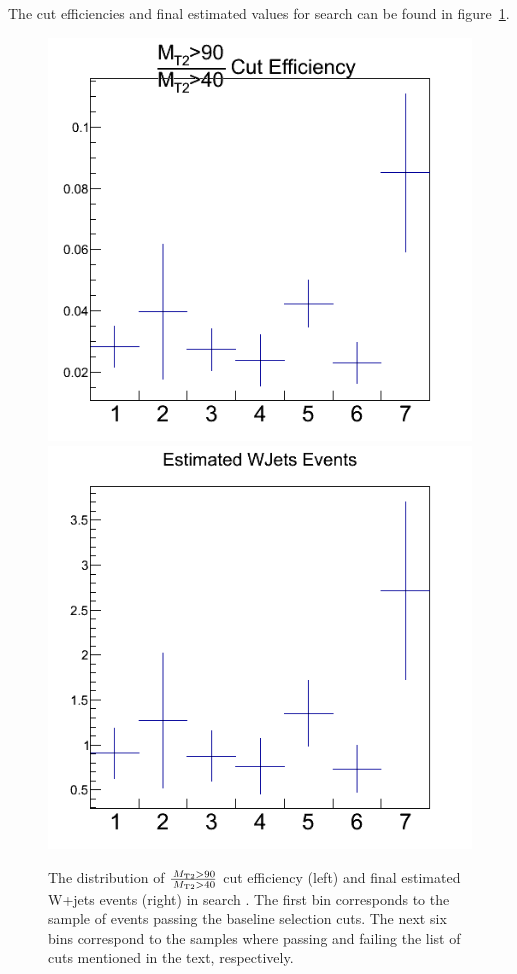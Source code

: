  The cut efficiencies and final estimated values for 
search \binone can be found in figure~\ref{fig:wjets_1}. 
\begin{figure}[iHhtb]
\centering
\includegraphics[angle=0,scale=0.35]{TauTauFigs/eff_bin1.png}
\includegraphics[angle=0,scale=0.35]{TauTauFigs/est_bin1.png} \\
\caption{The distribution of $\frac{\,{M_{\rm T2}}>90}{\,{M_{\rm T2}}>40}$ cut 
efficiency (left) and final estimated W+jets events (right) in search \binone.
 The first bin corresponds to the sample of events passing the baseline selection cuts. 
The next six bins correspond to the samples where passing and failing the 
list of cuts mentioned in the text, respectively.}
\label{fig:wjets_1}
\end{figure}

